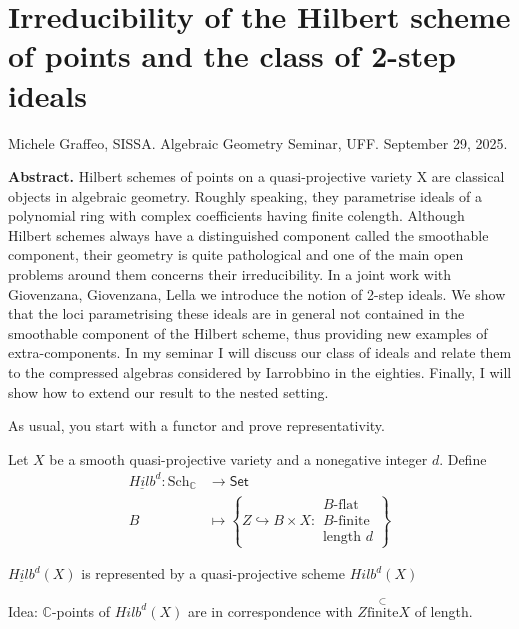 \section{Irreducibility of the Hilbert scheme of points and the class of 2-step
ideals}
\label{section-irreducibility-of-hilbert-scheme-of-points}

\noindent
Michele Graffeo, SISSA.
Algebraic Geometry Seminar, UFF. 
September 29, 2025.

\medskip
{\bf Abstract.}
Hilbert schemes of points on a quasi-projective variety X are classical objects
in algebraic geometry. Roughly speaking, they parametrise ideals of a polynomial
ring with complex coefficients having finite colength. Although Hilbert schemes
always have a distinguished component called the smoothable component, their
geometry is quite pathological and one of the main open problems around them
concerns their irreducibility. In a joint work with Giovenzana, Giovenzana,
Lella we introduce the notion of 2-step ideals. We show that the loci
parametrising these ideals are in general not contained in the smoothable
component of the Hilbert scheme, thus  providing new examples of
extra-components.  In my seminar I will discuss our class of ideals and relate
them to the compressed algebras considered by Iarrobbino in the eighties.
Finally, I will show how to extend our result to the nested setting.
 

\medskip\noindent

As usual, you start with a functor and
prove representativity.

\begin{definition}
\label{definition-hilbert-scheme}
Let $X$ be a smooth
quasi-projective variety and a nonegative integer $d$.
Define
\begin{align*}
\underline{Hilb}^d: \text{Sch}_\mathbb{C} &\longrightarrow \mathsf{Set} \\
B &\longmapsto \left\{Z \hookrightarrow B \times X:
\substack{B\text{-flat} \\ B\text{-finite}\\ \text{length }d}\right\}
\end{align*}
\end{definition}

\begin{theorem}[Grothendieck]
\label{theorem-grothendieck}
$\underline{Hilb}^d(X)$ is represented by a quasi-projective
scheme $Hilb^d(X)$
\end{theorem}

Idea: $\mathbb{C}$-points of $Hilb^d(X)$
are in correspondence with $Z \overset{\subset}{\text{finite}}X$
of length.

